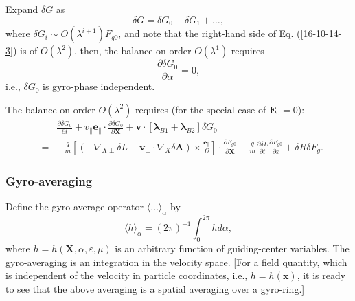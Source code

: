 \documentclass{llncs}
\newcommand{\tmmathbf}[1]{\ensuremath{\boldsymbol{#1}}}
\begin{document}
Expand $\delta G$ as
\[ \delta G = \delta G_0 + \delta G_1 + \ldots, \]
where $\delta G_i \sim O (\lambda^{i + 1}) F_{g 0}$, and note that the
right-hand side of Eq. (\ref{16-10-14-3}) is of $O (\lambda^2)$, then, the
balance on order $O (\lambda^1)$ requires
\begin{equation}
  \frac{\partial \delta G_0}{\partial \alpha} = 0,
\end{equation}
i.e., $\delta G_0$ is gyro-phase independent.

The balance on order $O (\lambda^2)$ requires (for the special case of
$\mathbf{E}_0 = 0$):
\begin{eqnarray}
  &  & \frac{\partial \delta G_0}{\partial t} + v_{\parallel}
  \mathbf{e}_{\parallel} \cdot \frac{\partial \delta G_0}{\partial \mathbf{X}}
  +\mathbf{v} \cdot [\tmmathbf{\lambda}_{B 1} +\tmmathbf{\lambda}_{B 2}]
  \delta G_0 \nonumber\\
  & = & - \frac{q}{m} \left[ (- \nabla_{X \perp} \delta L -\mathbf{v}_{\perp}
  \cdot \nabla_X \delta \mathbf{A}) \times
  \frac{\tmmathbf{e}_{\parallel}}{\Omega} \right] \cdot \frac{\partial F_{g
  0}}{\partial \mathbf{X}} - \frac{q}{m}  \frac{\partial \delta L}{\partial t}
  \frac{\partial F_{g 0}}{\partial \varepsilon} + \delta R \delta F_g . 
  \label{18-9-11-p1}
\end{eqnarray}

\subsubsection{Gyro-averaging}

Define the gyro-average operator $\langle \ldots \rangle_{\alpha}$ by
\begin{equation}
  \langle h \rangle_{\alpha} = (2 \pi)^{- 1} \int_0^{2 \pi} h d \alpha,
\end{equation}
where $h = h (\mathbf{X}, \alpha, \varepsilon, \mu)$ is an arbitrary function
of guiding-center variables. The gyro-averaging is an integration in the
velocity space. [For a field quantity, which is independent of the velocity in
particle coordinates, i.e., $h = h (\mathbf{x})$, it is ready to see that the
above averaging is a spatial averaging over a gyro-ring.]
\end{document}
